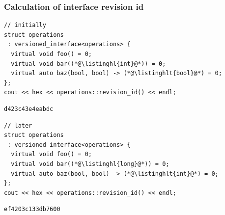\documentclass[compress,table,xcolor=table]{beamer}
\begin{document}
\begin{frame}[fragile]
  \frametitle{Calculation of interface revision id}
    \smaller
    \begin{lstlisting}[language=c++2x,basicstyle=\scriptsize\ttfamily]
// initially
struct operations
 : versioned_interface<operations> {
  virtual void foo() = 0;
  virtual void bar((*@\listinghl{int}@*)) = 0;
  virtual auto baz(bool, bool) -> (*@\listinghlt{bool}@*) = 0;
};
cout << hex << operations::revision_id() << endl;
    \end{lstlisting}
    \begin{verbatim}
d423c43e4eabdc
    \end{verbatim}
    \vfill
    \begin{lstlisting}[language=c++2x,basicstyle=\scriptsize\ttfamily]
// later
struct operations
 : versioned_interface<operations> {
  virtual void foo() = 0;
  virtual void bar((*@\listinghl{long}@*)) = 0;
  virtual auto baz(bool, bool) -> (*@\listinghlt{int}@*) = 0;
};
cout << hex << operations::revision_id() << endl;
    \end{lstlisting}
    \begin{verbatim}
ef4203c133db7600
    \end{verbatim}
\end{frame}
\end{document}
